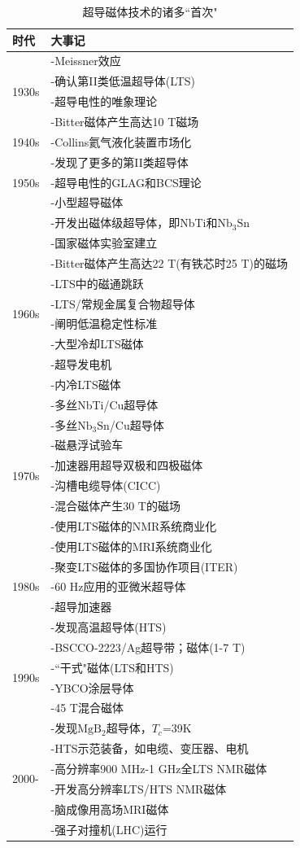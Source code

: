 \begin{table}[htbp]\small
  \centering
  \caption{超导磁体技术的诸多``首次"} \label{first event}

\begin{tabular}{ |l||l|}
\hline
时代 & 大事记  \\ \hline
\multirow{4}{*}{1930s} & -Meissner效应 \\
 & -确认第II类低温超导体(LTS)\\
 & -超导电性的唯象理论 \\
 & -Bitter磁体产生高达10 T磁场 \\
 \hline
 1940s & -Collins氦气液化装置市场化\\
 \hline
\multirow{3}{*}{1950s} & -发现了更多的第II类超导体 \\
 & -超导电性的GLAG和BCS理论\\
 & -小型超导磁体 \\
 \hline
 \multirow{10}{*}{1960s} & -开发出磁体级超导体，即NbTi和$\mathrm{Nb_3Sn}$ \\
 & -国家磁体实验室建立\\
 & -Bitter磁体产生高达22 T(有铁芯时25 T)的磁场\\
 & -LTS中的磁通跳跃\\
 & -LTS/常规金属复合物超导体\\
 & -阐明低温稳定性标准\\
 & -大型冷却LTS磁体\\
 & -超导发电机\\
 & -内冷LTS磁体\\
 & -多丝NbTi/Cu超导体\\
 \hline
 \multirow{6}{*}{1970s} & -多丝$\mathrm{Nb_3Sn}$/Cu超导体 \\
 & -磁悬浮试验车\\
 & -加速器用超导双极和四极磁体 \\
 & -沟槽电缆导体(CICC)\\
 & -混合磁体产生30 T的磁场\\
 & -使用LTS磁体的NMR系统商业化\\
 \hline
  \multirow{5}{*}{1980s} & -使用LTS磁体的MRI系统商业化 \\
 & -聚变LTS磁体的多国协作项目(ITER)\\
 & -60 Hz应用的亚微米超导体\\
 & -超导加速器\\
 & -发现高温超导体(HTS)\\
 \hline
   \multirow{4}{*}{1990s} & -BSCCO-2223/Ag超导带；磁体(1-7 T) \\
 & -``干式"磁体(LTS和HTS)\\
 & -YBCO涂层导体\\
 & -45 T混合磁体\\
 \hline
  \multirow{6}{*}{2000-} & -发现$\mathrm{MgB_2}$超导体，$T_c$=39K \\
 & -HTS示范装备，如电缆、变压器、电机\\
 & -高分辨率900 MHz-1 GHz全LTS NMR磁体 \\
 & -开发高分辨率LTS/HTS NMR磁体\\
 & -脑成像用高场MRI磁体\\
 & -强子对撞机(LHC)运行\\
 \hline
\end{tabular}


\end{table}
